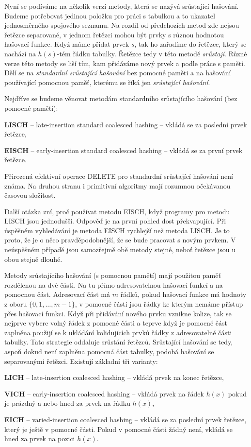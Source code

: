Nyní se podíváme na několik verzí metody, která se nazývá srůstající hašování.
Budeme potřebovat jedinou položku pro práci s tabulkou a to ukazatel
jednosměrného spojového seznamu. Na rozdíl od předchozích metod zde nejsou
řetězce separované, v jednom řetězci mohou být prvky s různou hodnotou hašovací
funkce. Když máme přidat prvek $s$, tak ho zařadíme do řetězce, který se nachází
na $h(s)$-tém řádku tabulky. Řetězce tedy v této metodě \emph{srůstají}. Různé
verze této metody se liší tím, kam přidáváme nový prvek a podle práce s pamětí.
Dělí se na \emph{standardní srůstající hašování} bez pomocné paměti a na hašování
používající pomocnou paměť, kterému se říká jen \emph{srůstající hašování}.

Nejdříve se budeme věnovat metodám standardního srůstajícího hašování (bez
pomocné paměti):
\begin{pitemize}
\item \textbf{LISCH} -- late-insertion standard coalesced hashing -- vkládá se
za poslední prvek řetězce,
\item \textbf{EISCH} -- early-insertion standard coalesced hashing -- vkládá se
za první prvek řetězce.
\end{pitemize}

Přirozená efektivní operace DELETE pro standardní srůstající hašování není
známa. Na druhou stranu i primitivní algoritmy mají rozumnou očekávanou časovou
složitost.

Další otázka zní, proč používat metodu EISCH, když programy pro metodu LISCH
jsou jednodušší. Odpověď je na první pohled dost překvapující. Při úspěšném
vyhledávání je metoda EISCH rychlejší než metoda LISCH. Je to proto, že je o
něco pravděpodobnější, že se bude pracovat s novým prvkem. V neúspěšném případě
jsou samozřejmě obě metody stejné, neboť řetězce jsou u obou stejně dlouhé.

Metody srůstajícího hašování (s pomocnou pamětí) mají použitou paměť rozdělenou
na dvě části. Na tu přímo adresovatelnou hašovací funkcí a na pomocnou část.
Adresovací část má $m$ řádků, pokud hašovací funkce má hodnoty z oboru
$\{0,1,\dots,m-1\}$, v pomocné části jsou řádky ke kterým nemáme přístup přes
hašovací funkci. Když při přidávání nového prvku vznikne kolize, tak se nejprve
vybere volný řádek z pomocné části a teprve když je pomocné část zaplněna
použijí se k ukládání kolidujících prvků řádky z adresovatelné části tabulky.
Tato strategie oddaluje srůstání řetězců. Srůstající hašování se tedy, aspoň
dokud není zaplněna pomocná část tabulky, podobá hašování se separovanými
řetězci. Existují základní tři varianty:
\begin{pitemize}
\item \textbf{LICH} -- late-insertion coalesced hashing -- vkládá prvek na konec
řetězce,
\item \textbf{VICH} -- early-insertion coalesced hashing -- vkládá prvek na
řádek $h(x)$ pokud je prázdný a nebo hned za prvek na řádku $h(x)$,
\item \textbf{EICH} -- varied-insertion coalesced hashing -- vkládá se za
poslední prvek řetězce, který je ještě v pomocné části. Pokud v pomocné části
žádný není, vkládá se hned za prvek na pozici $h(x)$.
\end{pitemize}

